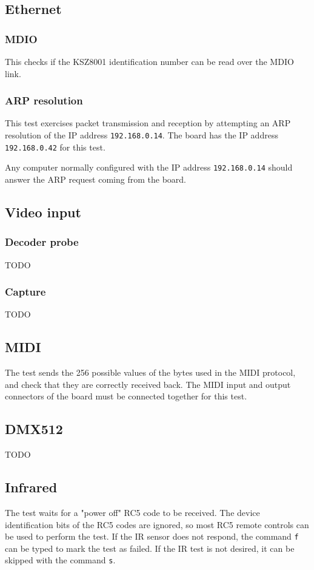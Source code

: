 \documentclass[a4paper,11pt]{article}
\begin{document}
\subsection{Ethernet}
\subsubsection{MDIO}
This checks if the KSZ8001 identification number can be read over the MDIO link.

\subsubsection{ARP resolution}
This test exercises packet transmission and reception by attempting an ARP resolution of the IP address \verb!192.168.0.14!. The board has the IP address \verb!192.168.0.42! for this test.

Any computer normally configured with the IP address \verb!192.168.0.14! should answer the ARP request coming from the board.

\subsection{Video input}
\subsubsection{Decoder probe}
TODO
\subsubsection{Capture}
TODO

\subsection{MIDI}
The test sends the 256 possible values of the bytes used in the MIDI protocol, and check that they are correctly received back. The MIDI input and output connectors of the board must be connected together for this test.

\subsection{DMX512}
TODO

\subsection{Infrared}
The test waits for a "power off" RC5 code to be received. The device identification bits of the RC5 codes are ignored, so most RC5 remote controls can be used to perform the test. If the IR sensor does not respond, the command \verb!f! can be typed to mark the test as failed. If the IR test is not desired, it can be skipped with the command \verb!s!.
\end{document}

